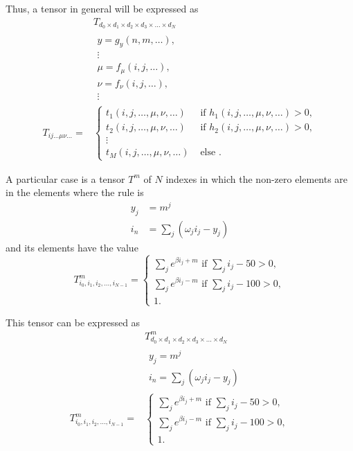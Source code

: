 Thus, a tensor in general will be expressed as
\begin{align*}
    &T_{d_0\times d_1\times d_2\times d_3\times \dots\times d_N}\\
    &\begin{gathered}
        y = g_y(n,m,\dots),\\
        \vdots\\
        \mu = f_\mu(i,j,\dots),\\
        \nu = f_\nu(i,j,\dots),\\
        \vdots
    \end{gathered}\\
    T_{ij\dots \mu\nu\dots} =&
    \begin{cases} 
    t_1(i,j,\dots,\mu,\nu,\dots)&\text{ if }  h_1(i,j,\dots,\mu,\nu,\dots)>0,\\
    t_2(i,j,\dots,\mu,\nu,\dots)&\text{ if }  h_2(i,j,\dots,\mu,\nu,\dots)>0,\\
    \vdots\\
    t_M(i,j,\dots,\mu,\nu,\dots)&\text{ else }.
   \end{cases}
\end{align*}

A particular case is a tensor $T^m$ of $N$ indexes in which the non-zero elements are in the elements where the rule is
\begin{align*}
    y_j& = m^j\\
    i_n& = \sum_{j} \left(\omega_j i_j -y_j\right) 
\end{align*}
and its elements have the value
\begin{equation}
        T^m_{i_0,i_1,i_2,\dots,i_{N-1}} = 
    \begin{cases}
        \sum_{j} e^{\beta i_j+m} \text{ if } \sum_j i_j -50 > 0,\\
        \sum_{j} e^{\beta i_j-m} \text{ if } \sum_j i_j -100 > 0,\\
        1.
    \end{cases}
\end{equation}

This tensor can be expressed as
\begin{align*}
    &T^m_{d_0\times d_1\times d_2\times d_3\times \dots\times d_N}\\
    &\begin{gathered}
        y_j = m^j\\
        i_n = \sum_{j} \left(\omega_j i_j -y_j\right)
    \end{gathered}\\
     T^m_{i_0,i_1,i_2,\dots,i_{N-1}} =& 
    \begin{cases}
        \sum_{j} e^{\beta i_j+m} \text{ if } \sum_j i_j -50 > 0,\\
        \sum_{j} e^{\beta i_j-m} \text{ if } \sum_j i_j -100 > 0,\\
        1.
    \end{cases}
\end{align*}

